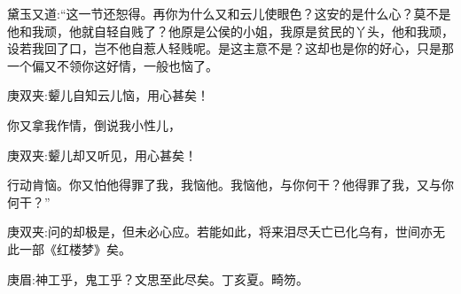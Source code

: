 \begin{parag}
    黛玉又道:“这一节还恕得。再你为什么又和云儿使眼色？这安的是什么心？莫不是他和我顽，他就自轻自贱了？他原是公侯的小姐，我原是贫民的丫头，他和我顽，设若我回了口，岂不他自惹人轻贱呢。是这主意不是？这却也是你的好心，只是那一个偏又不领你这好情，一般也恼了。\begin{note}庚双夹:颦儿自知云儿恼，用心甚矣！\end{note}你又拿我作情，倒说我小性儿，\begin{note}庚双夹:颦儿却又听见，用心甚矣！\end{note}行动肯恼。你又怕他得罪了我，我恼他。我恼他，与你何干？他得罪了我，又与你何干？”\begin{note}庚双夹:问的却极是，但未必心应。若能如此，将来泪尽夭亡已化乌有，世间亦无此一部《红楼梦》矣。\end{note}\begin{note}庚眉:神工乎，鬼工乎？文思至此尽矣。丁亥夏。畸笏。\end{note}
\end{parag}


